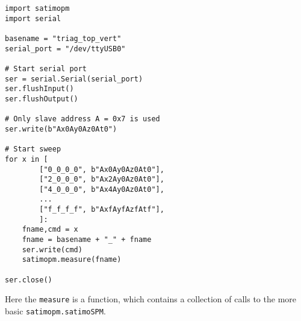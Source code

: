 \begin{lstlisting}
import satimopm
import serial

basename = "triag_top_vert"
serial_port = "/dev/ttyUSB0"

# Start serial port
ser = serial.Serial(serial_port)
ser.flushInput()
ser.flushOutput()

# Only slave address A = 0x7 is used
ser.write(b"Ax0Ay0Az0At0")

# Start sweep
for x in [
        ["0_0_0_0", b"Ax0Ay0Az0At0"],
        ["2_0_0_0", b"Ax2Ay0Az0At0"],
        ["4_0_0_0", b"Ax4Ay0Az0At0"],
        ...
        ["f_f_f_f", b"AxfAyfAzfAtf"],
        ]:
    fname,cmd = x
    fname = basename + "_" + fname
    ser.write(cmd)
    satimopm.measure(fname)

ser.close()
\end{lstlisting}

Here the \verb|measure| is a function, which contains a collection of calls to the more basic \verb|satimopm.satimoSPM|.






